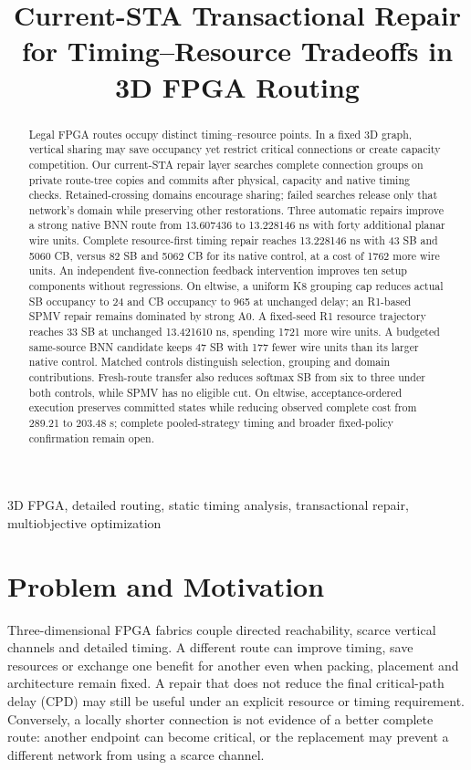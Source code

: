 \documentclass[conference,10pt]{IEEEtran}
\title{Current-STA Transactional Repair for Timing--Resource Tradeoffs in 3D FPGA Routing}
\author{\IEEEauthorblockN{Anonymous development manuscript}}
\begin{document}
\maketitle
\begin{abstract}
Legal FPGA routes occupy distinct timing--resource points. In a fixed 3D graph, vertical sharing may save occupancy yet restrict critical connections or create capacity competition. Our current-STA repair layer searches complete connection groups on private route-tree copies and commits after physical, capacity and native timing checks. Retained-crossing domains encourage sharing; failed searches release only that network's domain while preserving other restorations. Three automatic repairs improve a strong native BNN route from 13.607436 to 13.228146 ns with forty additional planar wire units. Complete resource-first timing repair reaches 13.228146 ns with 43 SB and 5060 CB, versus 82 SB and 5062 CB for its native control, at a cost of 1762 more wire units. An independent five-connection feedback intervention improves ten setup components without regressions. On eltwise, a uniform K8 grouping cap reduces actual SB occupancy to 24 and CB occupancy to 965 at unchanged delay; an R1-based SPMV repair remains dominated by strong A0. A fixed-seed R1 resource trajectory reaches 33 SB at unchanged 13.421610 ns, spending 1721 more wire units. A budgeted same-source BNN candidate keeps 47 SB with 177 fewer wire units than its larger native control. Matched controls distinguish selection, grouping and domain contributions. Fresh-route transfer also reduces softmax SB from six to three under both controls, while SPMV has no eligible cut. On eltwise, acceptance-ordered execution preserves committed states while reducing observed complete cost from 289.21 to 203.48 s; complete pooled-strategy timing and broader fixed-policy confirmation remain open.
\end{abstract}
\begin{IEEEkeywords}
3D FPGA, detailed routing, static timing analysis, transactional repair, multiobjective optimization
\end{IEEEkeywords}

\section{Problem and Motivation}
Three-dimensional FPGA fabrics couple directed reachability, scarce vertical channels and detailed timing. A different route can improve timing, save resources or exchange one benefit for another even when packing, placement and architecture remain fixed. A repair that does not reduce the final critical-path delay (CPD) may still be useful under an explicit resource or timing requirement. Conversely, a locally shorter connection is not evidence of a better complete route: another endpoint can become critical, or the replacement may prevent a different network from using a scarce channel.
\end{document}
